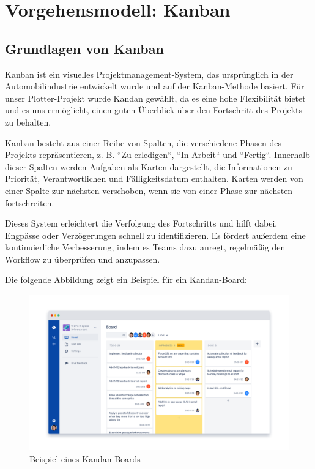 \documentclass[a4paper]{article}
\begin{document}
\newpage

\section{Vorgehensmodell: Kanban}
\subsection{Grundlagen von Kanban}
Kanban ist ein visuelles Projektmanagement-System, das ursprünglich in der Automobilindustrie entwickelt wurde und auf der Kanban-Methode basiert. Für unser Plotter-Projekt wurde Kandan gewählt, da es eine hohe Flexibilität bietet und es uns ermöglicht, einen guten Überblick über den Fortschritt des Projekts zu behalten.

Kanban besteht aus einer Reihe von Spalten, die verschiedene Phasen des Projekts repräsentieren, z. B. ``Zu erledigen``, ``In Arbeit`` und ``Fertig``. Innerhalb dieser Spalten werden Aufgaben als Karten dargestellt, die Informationen zu Priorität, Verantwortlichen und Fälligkeitsdatum enthalten. Karten werden von einer Spalte zur nächsten verschoben, wenn sie von einer Phase zur nächsten fortschreiten.

Dieses System erleichtert die Verfolgung des Fortschritts und hilft dabei, Engpässe oder Verzögerungen schnell zu identifizieren. Es fördert außerdem eine kontinuierliche Verbesserung, indem es Teams dazu anregt, regelmäßig den Workflow zu überprüfen und anzupassen.

Die folgende Abbildung zeigt ein Beispiel für ein Kandan-Board:

\begin{figure}[h]
	\centering
	\includegraphics[width=1\textwidth]{Resources/kanban_board_example.png}
	\caption{Beispiel eines Kandan-Boards}
	\label{fig:kanban_board_example}
\end{figure}
\end{document}
